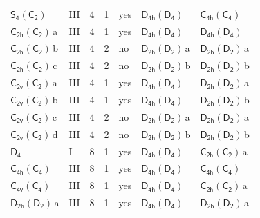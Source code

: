 \documentclass[10pt,a4paper]{article}
\numberwithin{equation}{section}
\newcommand{\grp}[1]{\mathsf{#1}}
\newcommand{\clsletter}[1]{\,{\scriptsize\color{black!55}#1}}
\begin{document}
{\begin{longtable}{@{}llrrlll@{}}
\href{S4-C2.pdf}{$\grp{S_{4}}(\grp{C_{2}})$} & III & 4 & 1 & yes & \href{D4h-D4.pdf}{$\grp{D_{4h}}(\grp{D_{4}})$} & \href{C4h-C4.pdf}{$\grp{C_{4h}}(\grp{C_{4}})$}\\
\href{C2h-C2.pdf}{$\grp{C_{2h}}(\grp{C_{2}})$}\clsletter{a} & III & 4 & 1 & yes & \href{D4h-D4.pdf}{$\grp{D_{4h}}(\grp{D_{4}})$} & \href{D4h-D4.pdf}{$\grp{D_{4h}}(\grp{D_{4}})$}\\
\href{C2h-C2.pdf}{$\grp{C_{2h}}(\grp{C_{2}})$}\clsletter{b} & III & 4 & 2 & no & \href{D2h-D2.pdf}{$\grp{D_{2h}}(\grp{D_{2}})$}\clsletter{a} & \href{D2h-D2.pdf}{$\grp{D_{2h}}(\grp{D_{2}})$}\clsletter{a}\\
\href{C2h-C2.pdf}{$\grp{C_{2h}}(\grp{C_{2}})$}\clsletter{c} & III & 4 & 2 & no & \href{D2h-D2.pdf}{$\grp{D_{2h}}(\grp{D_{2}})$}\clsletter{b} & \href{D2h-D2.pdf}{$\grp{D_{2h}}(\grp{D_{2}})$}\clsletter{b}\\
\href{C2v-C2.pdf}{$\grp{C_{2v}}(\grp{C_{2}})$}\clsletter{a} & III & 4 & 1 & yes & \href{D4h-D4.pdf}{$\grp{D_{4h}}(\grp{D_{4}})$} & \href{D2h-D2.pdf}{$\grp{D_{2h}}(\grp{D_{2}})$}\clsletter{a}\\
\href{C2v-C2.pdf}{$\grp{C_{2v}}(\grp{C_{2}})$}\clsletter{b} & III & 4 & 1 & yes & \href{D4h-D4.pdf}{$\grp{D_{4h}}(\grp{D_{4}})$} & \href{D2h-D2.pdf}{$\grp{D_{2h}}(\grp{D_{2}})$}\clsletter{b}\\
\href{C2v-C2.pdf}{$\grp{C_{2v}}(\grp{C_{2}})$}\clsletter{c} & III & 4 & 2 & no & \href{D2h-D2.pdf}{$\grp{D_{2h}}(\grp{D_{2}})$}\clsletter{a} & \href{D2h-D2.pdf}{$\grp{D_{2h}}(\grp{D_{2}})$}\clsletter{a}\\
\href{C2v-C2.pdf}{$\grp{C_{2v}}(\grp{C_{2}})$}\clsletter{d} & III & 4 & 2 & no & \href{D2h-D2.pdf}{$\grp{D_{2h}}(\grp{D_{2}})$}\clsletter{b} & \href{D2h-D2.pdf}{$\grp{D_{2h}}(\grp{D_{2}})$}\clsletter{b}\\
\href{../../../rotation/data/pdf/D4.pdf}{$\grp{D_{4}}$} & I & 8 & 1 & yes & \href{D4h-D4.pdf}{$\grp{D_{4h}}(\grp{D_{4}})$} & \href{C2h-C2.pdf}{$\grp{C_{2h}}(\grp{C_{2}})$}\clsletter{a}\\
\href{C4h-C4.pdf}{$\grp{C_{4h}}(\grp{C_{4}})$} & III & 8 & 1 & yes & \href{D4h-D4.pdf}{$\grp{D_{4h}}(\grp{D_{4}})$} & \href{C4h-C4.pdf}{$\grp{C_{4h}}(\grp{C_{4}})$}\\
\href{C4v-C4.pdf}{$\grp{C_{4v}}(\grp{C_{4}})$} & III & 8 & 1 & yes & \href{D4h-D4.pdf}{$\grp{D_{4h}}(\grp{D_{4}})$} & \href{C2h-C2.pdf}{$\grp{C_{2h}}(\grp{C_{2}})$}\clsletter{a}\\
\href{D2h-D2.pdf}{$\grp{D_{2h}}(\grp{D_{2}})$}\clsletter{a} & III & 8 & 1 & yes & \href{D4h-D4.pdf}{$\grp{D_{4h}}(\grp{D_{4}})$} & \href{D2h-D2.pdf}{$\grp{D_{2h}}(\grp{D_{2}})$}\clsletter{a}\\

\end{longtable}}
\end{document}
